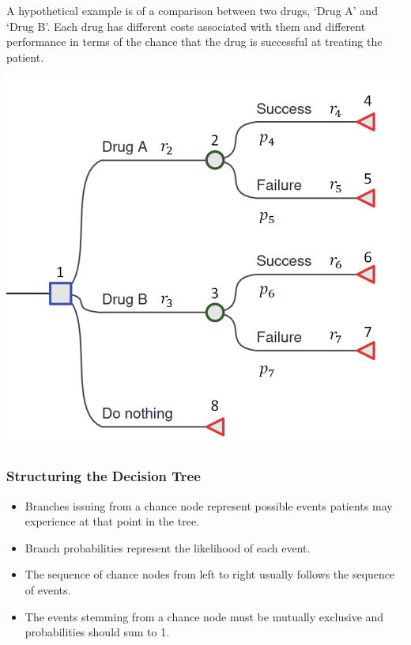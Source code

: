 \begin{frame}
A hypothetical example is of a comparison between two drugs, `Drug A' and
`Drug B'. Each drug has different costs associated with them and
different performance in terms of the chance that the drug is successful at treating the patient.

\includegraphics[width=\textwidth,height=0.8\textheight, keepaspectratio]{decision-trees/figs/dectree.png}

\end{frame}

\begin{frame}
\frametitle{Structuring the Decision Tree}
	\begin{itemize}
		\item Branches issuing from a chance node represent possible events patients may experience at that point in the tree.
		\item Branch probabilities represent the likelihood of each event.
		\item The sequence of chance nodes from left to right usually follows the sequence of events.
		\item The events stemming from a chance node must be \alert{mutually exclusive} and probabilities should sum to 1.
	\end{itemize}
\end{frame}



